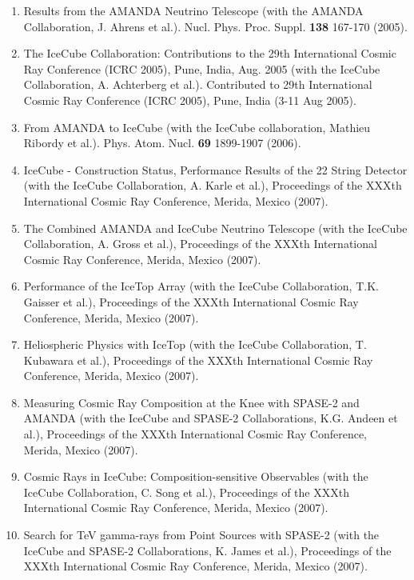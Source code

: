 \begin{enumerate}
\item Results from the AMANDA Neutrino Telescope (with the AMANDA
  Collaboration, J. Ahrens et al.).  Nucl. Phys. Proc. Suppl. {\bf
    138} 167-170 (2005).

\item The IceCube Collaboration: Contributions to the 29th
  International Cosmic Ray Conference (ICRC 2005), Pune, India,
  Aug. 2005 (with the IceCube Collaboration, A. Achterberg et al.).
  Contributed to 29th International Cosmic Ray Conference (ICRC 2005),
  Pune, India (3-11 Aug 2005).

\item From AMANDA to IceCube (with the IceCube collaboration, Mathieu
  Ribordy et al.).  Phys. Atom. Nucl. {\bf 69} 1899-1907 (2006).

\item IceCube - Construction Status, Performance Results of the 22
  String Detector (with the IceCube Collaboration, A. Karle et al.),
  Proceedings of the XXXth International Cosmic Ray Conference,
  Merida, Mexico (2007).

\item The Combined AMANDA and IceCube Neutrino Telescope (with the
  IceCube Collaboration, A. Gross et al.), Proceedings of the XXXth
  International Cosmic Ray Conference, Merida, Mexico (2007).

\item Performance of the IceTop Array (with the IceCube Collaboration,
  T.K. Gaisser et al.), Proceedings of the XXXth International Cosmic
  Ray Conference, Merida, Mexico (2007).

\item Heliospheric Physics with IceTop (with the IceCube
  Collaboration, T. Kubawara et al.), Proceedings of the XXXth
  International Cosmic Ray Conference, Merida, Mexico (2007).

\item Measuring Cosmic Ray Composition at the Knee with SPASE-2 and
  AMANDA (with the IceCube and SPASE-2 Collaborations, K.G. Andeen et
  al.), Proceedings of the XXXth International Cosmic Ray Conference,
  Merida, Mexico (2007).

\item Cosmic Rays in IceCube: Composition-sensitive Observables (with
  the IceCube Collaboration, C. Song et al.), Proceedings of the XXXth
  International Cosmic Ray Conference, Merida, Mexico (2007).

\item Search for TeV gamma-rays from Point Sources with SPASE-2 (with
  the IceCube and SPASE-2 Collaborations, K. James et al.),
  Proceedings of the XXXth International Cosmic Ray Conference,
  Merida, Mexico (2007).


\end{enumerate}
